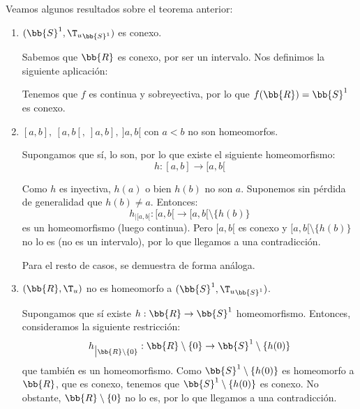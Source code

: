 \begin{ejemplo}
    Veamos algunos resultados sobre el teorema anterior:
    \begin{enumerate}
        \item $(\bb{S}^1, {\T_u}_{\bb{S}^1})$ es conexo.

        Sabemos que $\bb{R}$ es conexo, por ser un intervalo. Nos definimos la siguiente aplicación:

        Tenemos que $f$ es continua y sobreyectiva, por lo que $f(\bb{R})=\bb{S}^1$ es conexo.

        \item $[a,b],~[a,b[, ~]a,b], ~]a,b[$ con $a<b$ no son homeomorfos.

        Supongamos que sí, lo son, por lo que existe el siguiente homeomorfismo:
        \begin{equation*}
            h:[a,b]\to [a,b[
        \end{equation*}

        Como $h$ es inyectiva, $h(a)$ o bien $h(b)$ no son $a$. Suponemos sin pérdida de generalidad que $h(b)\neq a$. Entonces:
        \begin{equation*}
            h_{\big| [a,b[}:[a,b[\longrightarrow [a,b[\setminus \{h(b)\}
        \end{equation*}
        es un homeomorfismo (luego continua). Pero $[a,b[$ es conexo y $[a,b[\setminus \{h(b)\}$ no lo es (no es un intervalo), por lo que llegamos a una contradicción.

        Para el resto de casos, se demuestra de forma análoga.

        \item $(\bb{R}, \T_u)$ no es homeomorfo a $(\bb{S}^1, {\T_u}_{\bb{S}^1})$.

        Supongamos que sí existe $h:\bb{R}\to \bb{S}^1$ homeomorfismo. Entonces, consideramos la siguiente restricción:
        \begin{equation*}
            h_{\big | \bb{R}\setminus \{0\}}: \bb{R}\setminus \{0\} \to \bb{S}^1\setminus \{h(0)\}
        \end{equation*}
        que también es un homeomorfismo. Como $\bb{S}^1\setminus \{h(0)\}$ es homeomorfo a $\bb{R}$, que es conexo, tenemos que $\bb{S}^1\setminus \{h(0)\}$ es conexo. No obstante, $\bb{R}\setminus \{0\}$ no lo es, por lo que llegamos a una contradicción.
    \end{enumerate}
\end{ejemplo}

